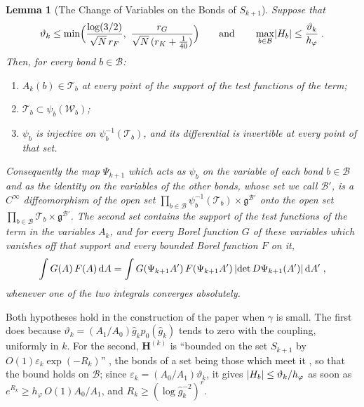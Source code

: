 \documentclass[11pt]{preprint}
\newcommand{\dd}{\mathrm{d}}
\DeclarePairedDelimiter{\abs}{\lvert}{\rvert}
\numberwithin{equation}{section}
\newtheorem{lemma}{Lemma}[section]
\theoremstyle{definition}
\theoremstyle{remark}
\theoremstyle{plain}
\begin{document}
\begin{lemma}[The Change of Variables on the Bonds of $S_{k+1}$]\label{lem:boundary-change}
Suppose that
\begin{equation}\label{eq:boundary-change-hypotheses}
    \vartheta_k \leq \min\Bigl(\frac{\log(3/2)}{\sqrt N\,r_F},\ \frac{r_G}{\sqrt N\,(r_K + \frac{1}{40})}\Bigr)
    \qquad\text{and}\qquad
    \max_{b \in \mathcal B}\abs{H_b} \leq \frac{\vartheta_k}{h_\varphi}\;.
\end{equation}
Then, for every bond $b \in \mathcal B$:
\begin{enumerate}[label=(\alph*)]
\item $A_k(b) \in \mathcal T_b$ at every point of the support of the test functions of the term;
\item $\mathcal T_b \subset \psi_b(\mathcal W_b)$;
\item $\psi_b$ is injective on $\psi_b^{-1}(\mathcal T_b)$, and its differential is invertible at every point of that set.
\end{enumerate}
Consequently the map $\Psi_{k+1}$ which acts as $\psi_b$ on the variable of each bond $b \in \mathcal B$ and as the identity on the variables of the other bonds, whose set we call $\mathcal B'$, is a $C^\infty$ diffeomorphism of the open set $\prod_{b \in \mathcal B}\psi_b^{-1}(\mathcal T_b) \times \mathfrak g^{\mathcal B'}$ onto the open set $\prod_{b \in \mathcal B}\mathcal T_b \times \mathfrak g^{\mathcal B'}$. The second set contains the support of the test functions of the term in the variables $A_k$, and for every Borel function $G$ of these variables which vanishes off that support and every bounded Borel function $F$ on it,
\begin{equation}\label{eq:boundary-change-identity}
    \int G(A)\,F(A)\,\dd A = \int G(\Psi_{k+1}A')\,F(\Psi_{k+1}A')\,\abs{\det D\Psi_{k+1}(A')}\,\dd A'\;,
\end{equation}
whenever one of the two integrals converges absolutely.
\end{lemma}

Both hypotheses hold in the construction of the paper when $\gamma$ is small. The first does because $\vartheta_k = (A_1/A_0)\hat g_kp_0(\hat g_k)$ tends to zero with the coupling, uniformly in $k$. For the second, $\mathbf H^{(k)}$ is ``bounded on the set $S_{k+1}$ by $O(1)\varepsilon_k\exp(-R_k)$'' \cite[p.~269]{BalabanCRE}, the bonds of a set being those which meet it \cite[p.~251]{BalabanRG1}, so that the bound holds on $\mathcal B$; since $\varepsilon_k = (A_0/A_1)\vartheta_k$, it gives $\abs{H_b} \leq \vartheta_k/h_\varphi$ as soon as $e^{R_k} \geq h_\varphi\,O(1)A_0/A_1$, and $R_k \geq (\log\hat g_k^{-2})^r$.
\end{document}
